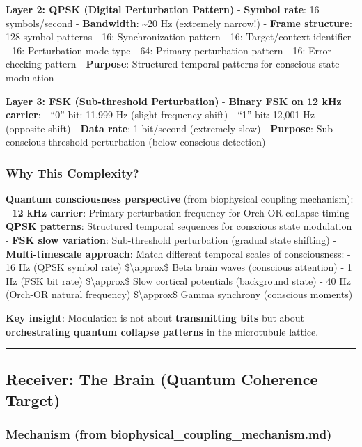 \textbf{Layer 2: QPSK (Digital Perturbation Pattern)} - \textbf{Symbol
rate}: 16 symbols/second - \textbf{Bandwidth}: \textasciitilde20 Hz
(extremely narrow!) - \textbf{Frame structure}: 128 symbol patterns -
16: Synchronization pattern - 16: Target/context identifier - 16:
Perturbation mode type - 64: Primary perturbation pattern - 16: Error
checking pattern - \textbf{Purpose}: Structured temporal patterns for
conscious state modulation

\textbf{Layer 3: FSK (Sub-threshold Perturbation)} - \textbf{Binary FSK
on 12 kHz carrier}: - ``0'' bit: 11,999 Hz (slight frequency shift) -
``1'' bit: 12,001 Hz (opposite shift) - \textbf{Data rate}: 1 bit/second
(extremely slow) - \textbf{Purpose}: Sub-conscious threshold
perturbation (below conscious detection)

\subsubsection{Why This Complexity?}\label{why-this-complexity}

\textbf{Quantum consciousness perspective} (from biophysical coupling
mechanism): - \textbf{12 kHz carrier}: Primary perturbation frequency
for Orch-OR collapse timing - \textbf{QPSK patterns}: Structured
temporal sequences for conscious state modulation - \textbf{FSK slow
variation}: Sub-threshold perturbation (gradual state shifting) -
\textbf{Multi-timescale approach}: Match different temporal scales of
consciousness: - 16 Hz (QPSK symbol rate) \$\textbackslash approx\$ Beta
brain waves (conscious attention) - 1 Hz (FSK bit rate)
\$\textbackslash approx\$ Slow cortical potentials (background state) -
40 Hz (Orch-OR natural frequency) \$\textbackslash approx\$ Gamma
synchrony (conscious moments)

\textbf{Key insight}: Modulation is not about \textbf{transmitting bits}
but about \textbf{orchestrating quantum collapse patterns} in the
microtubule lattice.

\begin{center}\rule{0.5\linewidth}{0.5pt}\end{center}

\subsection{Receiver: The Brain (Quantum Coherence
Target)}\label{receiver-the-brain-quantum-coherence-target}

\subsubsection{Mechanism (from
biophysical\_coupling\_mechanism.md)}\label{mechanism-from-biophysical_coupling_mechanism.md}

